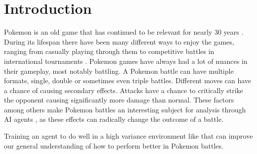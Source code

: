 \chapter{Introduction}
\label{chap:introduction}

    Pokemon is an old game that has continued to be relevant for nearly 30 years \cite{Pokemon}. 
During its lifespan there have been many different ways to enjoy the games, ranging from casually playing through them 
to competitive battles in international tournaments \cite{WaysToPlayPokemon}. Pokemon games have always had a lot of 
nuances in their gameplay, most notably battling. A Pokemon battle can have multiple formats, single, double or sometimes 
even triple battles. Different moves can have a chance of causing secondary effects. Attacks have a chance to critically 
strike the opponent causing significantly more damage than normal. These factors among others make Pokemon battles an 
interesting subject for analysis through AI agents \cite{PokeEnv}, as these effects can radically change the outcome 
of a battle. 

Training an agent to do well in a high variance environment like that can improve our general understanding 
of how to perform better in Pokemon battles.


